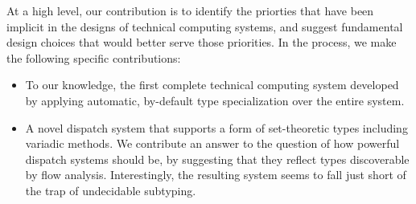 \iffalse
Our first contribution is a discussion of the nature of technical computing
that suggests which language-level abstractions might best support its use
cases.
Simply put technical computing has by and large happened
without sufficient probing and analysis as to what it is.

Based on the theory that technical computing is characterized by complex
operators and particular combinations of binding time behavior.
\fi

At a high level, our contribution is to identify the priorties
that have been implicit in the designs of technical computing systems,
and suggest fundamental design choices that would better serve those
priorities.
In the process, we make the following specific contributions:

\begin{itemize}
\item To our knowledge, the first complete technical computing system
developed by applying automatic, by-default type specialization over the
entire system.

\item A novel dispatch system that supports a form of set-theoretic types
including variadic methods.
We contribute an answer to the question of how powerful dispatch systems
should be, by suggesting that they reflect types discoverable by flow
analysis.
Interestingly, the resulting system seems to fall just short of the trap
of undecidable subtyping.








\end{itemize}
